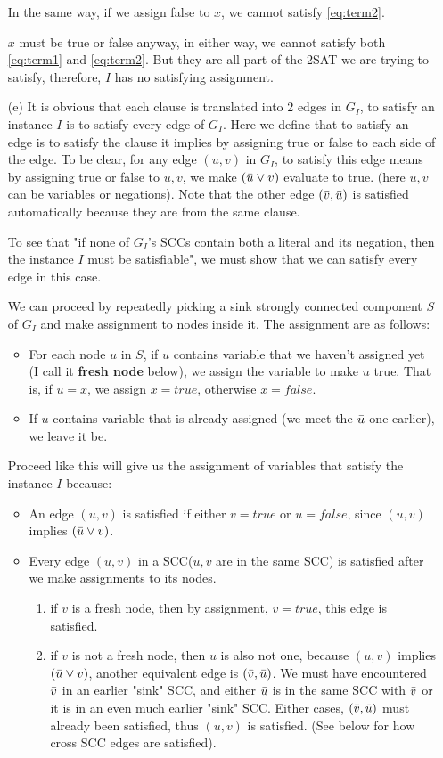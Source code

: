 \documentclass[twoside]{homework}
\begin{document}
\begin{enumerate}
		In the same way, if we assign false to $x$, we cannot satisfy \ref{eq:term2}.

		$x$ must be true or false anyway, in either way, we cannot satisfy both \ref{eq:term1} and \ref{eq:term2}. But they are all part of the 2SAT we are trying to satisfy, therefore, $I$ has no satisfying assignment.

		\item [(e)] It is obvious that each clause is translated into 2 edges in $G_I$, to satisfy an instance $I$ is to satisfy every edge of $G_I$. Here we define that to satisfy an edge is to satisfy the clause it implies by assigning true or false to each side of the edge. To be clear, for any edge $(u, v)$ in $G_I$, to satisfy this edge means by assigning true or false to $u, v$, we make $(\bar{u} \lor v)$ evaluate to true. (here $u, v$ can be variables or negations). Note that the other edge $(\bar{v}, \bar{u})$ is satisfied automatically because they are from the same clause.

		To see that "if none of $G_I$'s SCCs contain both a literal and its negation, then the instance $I$ must be satisfiable", we must show that we can satisfy every edge in this case.

		We can proceed by repeatedly picking a sink strongly connected component $S$ of $G_I$ and make assignment to nodes inside it. The assignment are as follows:
		\begin{itemize}
			\item For each node $u$ in $S$, if $u$ contains variable that we haven't assigned yet (I call it \textbf{fresh node} below), we assign the variable to make $u$ true. That is, if $u = x$, we assign $x = true$, otherwise $x = false$.
			\item If $u$ contains variable that is already assigned (we meet the $\bar{u}$ one earlier), we leave it be.
		\end{itemize}
		Proceed like this will give us the assignment of variables that satisfy the instance $I$ because:
		\begin{itemize}
			\item An edge $(u, v)$ is satisfied if either $v = true$ or $u = false$, since $(u, v)$ implies $(\bar{u} \lor v)$.
			\item Every edge $(u, v)$ in a SCC($u, v$ are in the same SCC) is satisfied after we make assignments to its nodes.
				\begin{enumerate}
					\item if $v$ is a fresh node, then by assignment, $v = true$, this edge is satisfied.
					\item if $v$ is not a fresh node, then $u$ is also not one, because $(u, v)$ implies $(\bar{u} \lor v)$, another equivalent edge is $(\bar{v}, \bar{u})$. We must have encountered $\bar{v}$ in an earlier "sink" SCC, and either $\bar{u}$ is in the same SCC with $\bar{v}$ or it is in an even much earlier "sink" SCC. Either cases, $(\bar{v}, \bar{u})$ must already been satisfied, thus $(u, v)$ is satisfied. (See below for how cross SCC edges are satisfied).
				\end{enumerate}


\end{itemize}
\end{enumerate}
\end{document}

